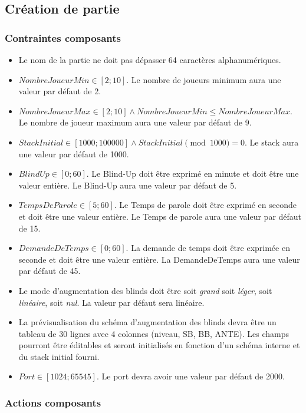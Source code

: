 \subsection{Création de partie}

\subsubsection{Contraintes composants}

\begin{itemize}
	\item Le nom de la partie ne doit pas dépasser 64 caractères alphanumériques.
	\item $NombreJoueurMin \in [2 ; 10]$. Le nombre de joueurs minimum aura une 
	      valeur par défaut de 2.
	\item $NombreJoueurMax \in [2 ; 10] \wedge NombreJoueurMin \leq 
	      NombreJoueurMax$. Le nombre de joueur maximum aura une valeur 
	      par défaut de 9.
	\item $StackInitial \in [1 000 ; 100 000] \wedge StackInitial \pmod{1000}
	       = 0 $. Le stack aura une valeur par défaut de 1000.
	\item $BlindUp \in [0 ; 60]$. Le Blind-Up doit être exprimé en minute et 
	      doit être une valeur entière. Le Blind-Up aura une valeur par défaut 
	      de 5. 
	\item $TempsDeParole \in [5; 60]$. Le Temps de parole doit être exprimé en 
	      seconde et doit être une valeur entière. Le Temps de parole aura une 
	      valeur par défaut de 15.
	\item $DemandeDeTemps \in [0; 60]$. La demande de temps doit être exprimée 
	      en seconde et doit être une valeur entière. La DemandeDeTemps aura une
	      valeur par défaut de 45.
	\item Le mode d'augmentation des blinds doit être soit \textit{grand} soit 
	      \textit{léger}, soit \textit{linéaire}, soit \textit{nul}. La valeur 
	      par défaut sera linéaire.
	\item La prévisualisation du schéma d'augmentation des blinds devra être un 
	      tableau de 30 lignes avec 4 colonnes (niveau, SB, BB, ANTE). 
	      Les champs pourront être éditables et seront initialisés en fonction 
	      d'un schéma interne et du stack initial fourni.
	\item $Port \in [1024 ; 65545]$. Le port devra avoir une valeur par défaut de 2000.
\end{itemize}

\subsubsection{Actions composants}

